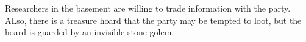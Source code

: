Researchers in the basement are willing to trade information with the party.
ALso, there is a treasure hoard that the party may be tempted to loot, but the hoard is guarded by an invisible stone golem.
